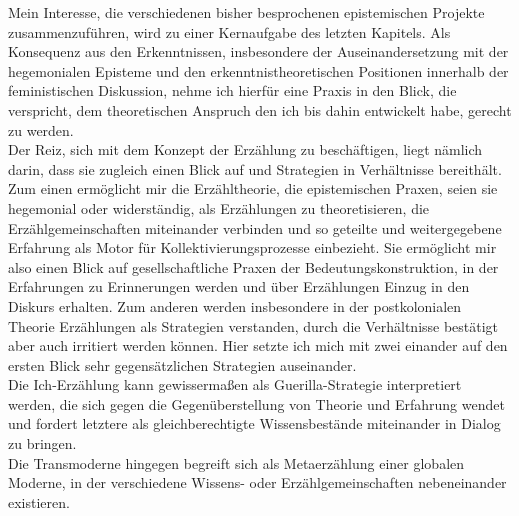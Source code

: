Mein Interesse, die verschiedenen bisher besprochenen epistemischen Projekte
zusammenzuführen, wird zu einer Kernaufgabe des letzten Kapitels. Als Konsequenz
aus den Erkenntnissen, insbesondere der Auseinandersetzung mit der hegemonialen
Episteme und den erkenntnistheoretischen Positionen innerhalb der feministischen
Diskussion,  nehme ich hierfür eine Praxis in den Blick, die verspricht, dem
theoretischen Anspruch den ich bis dahin entwickelt habe, gerecht zu werden.\\
 Der
Reiz, sich mit dem Konzept der Erzählung zu beschäftigen, liegt nämlich darin,
dass sie zugleich einen Blick auf und Strategien in Verhältnisse bereithält. \\
Zum
einen ermöglicht mir die Erzähltheorie, die epistemischen Praxen, seien sie
hegemonial oder widerständig, als Erzählungen zu theoretisieren, die
Erzählgemeinschaften miteinander verbinden und so geteilte und weitergegebene
Erfahrung als Motor für Kollektivierungsprozesse einbezieht. Sie ermöglicht mir
also einen Blick auf gesellschaftliche Praxen der Bedeutungskonstruktion, in der
Erfahrungen zu Erinnerungen werden und über Erzählungen Einzug in den Diskurs
erhalten. Zum anderen werden insbesondere in der postkolonialen Theorie
Erzählungen als Strategien verstanden, durch die Verhältnisse bestätigt aber
auch irritiert werden können. Hier setzte ich mich mit zwei einander auf den
ersten Blick sehr gegensätzlichen Strategien auseinander. \\
Die Ich-Erzählung kann
gewissermaßen als Guerilla-Strategie interpretiert werden, die sich gegen die
Gegenüberstellung von Theorie und Erfahrung wendet und fordert letztere als
gleichberechtigte Wissensbestände miteinander in Dialog zu bringen. \\
Die
Transmoderne hingegen begreift sich als Metaerzählung einer globalen Moderne, in
der verschiedene Wissens- oder Erzählgemeinschaften nebeneinander existieren.
\\

